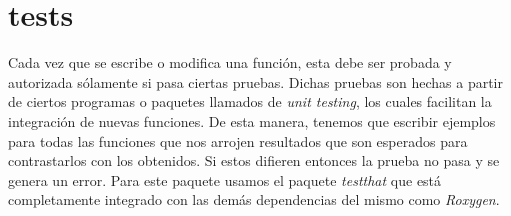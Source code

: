\section{tests}
Cada vez que se escribe o modifica una función, esta debe ser probada y autorizada sólamente si pasa ciertas pruebas. Dichas pruebas son hechas a partir de ciertos programas o paquetes llamados de \textit{unit testing}, los cuales facilitan la integración de nuevas funciones. De esta manera, tenemos que escribir ejemplos para todas las funciones que nos arrojen resultados que  son esperados para contrastarlos con los  obtenidos. Si estos difieren entonces la prueba no pasa y se genera un error. Para este paquete usamos el paquete \textit{testthat} que está completamente integrado con las demás dependencias del mismo como \textit{Roxygen}.



